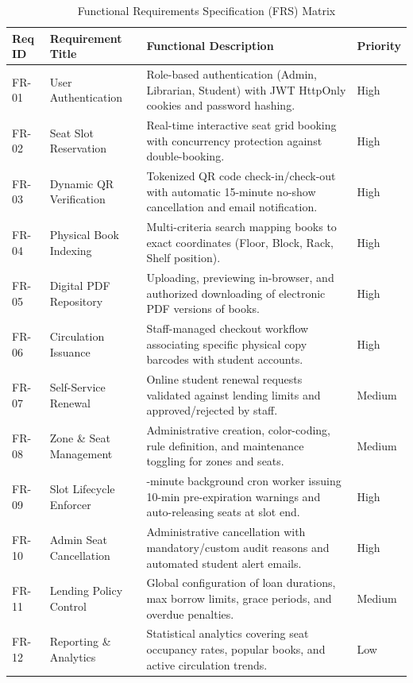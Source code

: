 \begin{table}[H]
\centering
\caption{Functional Requirements Specification (FRS) Matrix}
\label{tab:frs_matrix}
\small
\begin{tabularx}{\textwidth}{>{\centering\arraybackslash}p{1.5cm} >{\raggedright\arraybackslash}p{3.8cm} >{\raggedright\arraybackslash}X >{\centering\arraybackslash}p{1.5cm}}
\toprule
\textbf{Req ID} & \textbf{Requirement Title} & \textbf{Functional Description} & \textbf{Priority} \\
\midrule
FR-01 & User Authentication & Role-based authentication (Admin, Librarian, Student) with JWT HttpOnly cookies and password hashing. & High \\
FR-02 & Seat Slot Reservation & Real-time interactive seat grid booking with concurrency protection against double-booking. & High \\
FR-03 & Dynamic QR Verification & Tokenized QR code check-in/check-out with automatic 15-minute no-show cancellation and email notification. & High \\
FR-04 & Physical Book Indexing & Multi-criteria search mapping books to exact coordinates (Floor, Block, Rack, Shelf position). & High \\
FR-05 & Digital PDF Repository & Uploading, previewing in-browser, and authorized downloading of electronic PDF versions of books. & High \\
FR-06 & Circulation Issuance & Staff-managed checkout workflow associating specific physical copy barcodes with student accounts. & High \\
FR-07 & Self-Service Renewal & Online student renewal requests validated against lending limits and approved/rejected by staff. & Medium \\
FR-08 & Zone \& Seat Management & Administrative creation, color-coding, rule definition, and maintenance toggling for zones and seats. & Medium \\
FR-09 & Slot Lifecycle Enforcer & 1-minute background cron worker issuing 10-min pre-expiration warnings and auto-releasing seats at slot end. & High \\
FR-10 & Admin Seat Cancellation & Administrative cancellation with mandatory/custom audit reasons and automated student alert emails. & High \\
FR-11 & Lending Policy Control & Global configuration of loan durations, max borrow limits, grace periods, and overdue penalties. & Medium \\
FR-12 & Reporting \& Analytics & Statistical analytics covering seat occupancy rates, popular books, and active circulation trends. & Low \\
\bottomrule
\end{tabularx}
\end{table}

